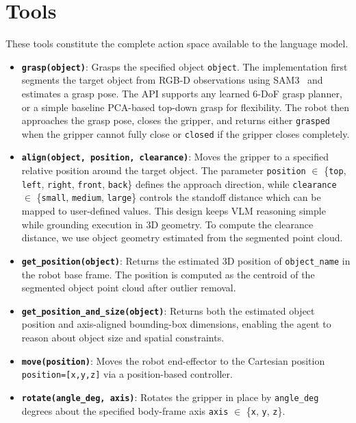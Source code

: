 \section{Tools}

These tools constitute the complete action space available to the language model.

\begin{itemize}
\item \textbf{\texttt{grasp(object)}}: Grasps the specified object \texttt{object}. The implementation first segments the target object from RGB-D observations using SAM3~\citep{carion2025sam} and estimates a grasp pose. The API supports any learned 6-DoF grasp planner, or a simple baseline PCA-based top-down grasp for flexibility. The robot then approaches the grasp pose, closes the gripper, and returns either \texttt{grasped} when the gripper cannot fully close or \texttt{closed} if the gripper closes completely.

\item \textbf{\texttt{align(object, position, clearance)}}: 
Moves the gripper to a specified relative position around the target object. 
The parameter \texttt{position} $\in$ \{\texttt{top}, \texttt{left}, \texttt{right}, \texttt{front}, \texttt{back}\} defines the approach direction, while \texttt{clearance} $\in$ \{\texttt{small}, \texttt{medium}, \texttt{large}\} controls the standoff distance which can be mapped to user-defined values. 
This design keeps VLM reasoning simple while grounding execution in 3D geometry.
To compute the clearance distance, we use object geometry estimated from the segmented point cloud.

\item \textbf{\texttt{get\_position(object)}}: Returns the estimated 3D position of \texttt{object\_name} in the robot base frame. The position is computed as the centroid of the segmented object point cloud after outlier removal.

\item \textbf{\texttt{get\_position\_and\_size(object)}}: Returns both the estimated object position and axis-aligned bounding-box dimensions, enabling the agent to reason about object size and spatial constraints.

\item \textbf{\texttt{move(position)}}: Moves the robot end-effector to the Cartesian position \texttt{position=[x,y,z]} via a position-based controller.

\item \textbf{\texttt{rotate(angle\_deg, axis)}}: Rotates the gripper in place by \texttt{angle\_deg} degrees about the specified body-frame axis \texttt{axis} $\in$ \{\texttt{x}, \texttt{y}, \texttt{z}\}.


\end{itemize}
